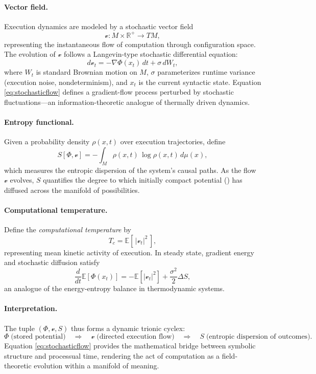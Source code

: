 \documentclass[12pt,a4paper]{article}
\theoremstyle{plain}
\theoremstyle{definition}
\theoremstyle{remark}
\newcommand{\Phifield}{\Phi}
\newcommand{\vfield}{\mathcal{v}}
\newcommand{\Sfield}{S}
\begin{document}
\paragraph{Vector field.}
Execution dynamics are modeled by a stochastic vector field
\[
\vfield : M \times \mathbb{R}^{+} \longrightarrow TM,
\]
representing the instantaneous flow of computation through configuration space. The evolution of $\vfield$ follows a Langevin-type stochastic differential equation:
\begin{equation}
\label{eq:stochasticflow}
d\vfield_t = -\nabla\Phifield(x_t)\,dt + \sigma\,dW_t,
\end{equation}
where $W_t$ is standard Brownian motion on $M$, $\sigma$ parameterizes runtime variance (execution noise, nondeterminism), and $x_t$ is the current syntactic state. Equation \eqref{eq:stochasticflow} defines a gradient-flow process perturbed by stochastic fluctuations---an information-theoretic analogue of thermally driven dynamics.

\paragraph{Entropy functional.}
Given a probability density $\rho(x,t)$ over execution trajectories, define
\begin{equation}
\Sfield[\Phifield,\vfield] = -\!\int_{M} \rho(x,t)\,\log\rho(x,t)\,d\mu(x),
\end{equation}
which measures the entropic dispersion of the system’s causal paths. As the flow $\vfield$ evolves, $\Sfield$ quantifies the degree to which initially compact potential (\Phifield) has diffused across the manifold of possibilities.

\paragraph{Computational temperature.}
Define the \emph{computational temperature} by
\[
T_c = \mathbb{E}[\,|\vfield_t|^2\,],
\]
representing mean kinetic activity of execution. In steady state, gradient energy and stochastic diffusion satisfy
\[
\frac{d}{dt}\mathbb{E}[\Phifield(x_t)] = -\mathbb{E}[|\vfield_t|^2] + \frac{\sigma^2}{2}\Delta \Sfield,
\]
an analogue of the energy-entropy balance in thermodynamic systems.

\paragraph{Interpretation.}
The tuple $(\Phifield,\vfield,\Sfield)$ thus forms a dynamic trionic cyclex:
\[
\Phifield \;\text{(stored potential)}
\quad\Longrightarrow\quad
\vfield \;\text{(directed execution flow)}
\quad\Longrightarrow\quad
\Sfield \;\text{(entropic dispersion of outcomes)}.
\]
Equation \eqref{eq:stochasticflow} provides the mathematical bridge between symbolic structure and processual time, rendering the act of computation as a field-theoretic evolution within a manifold of meaning.
\end{document}
